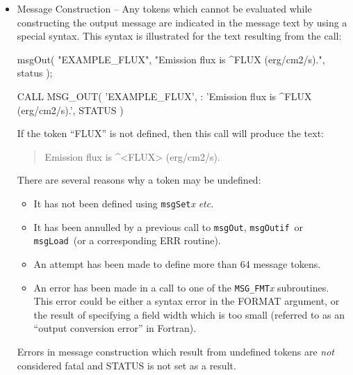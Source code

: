 \documentclass[twoside,11pt]{starlink}
\providecommand{\func}[1]{\texttt{#1}}
\providecommand{\msgload}{\func{msgLoad}}
\providecommand{\msgout}{\func{msgOut}}
\providecommand{\msgoutif}{\func{msgOutif}}
\begin{document}
\begin {itemize}
\item Message Construction -- Any tokens which cannot be evaluated while
constructing the output message are indicated in the message text by using a
special syntax.
This syntax is illustrated for the text resulting from the call:

\begin {small}
\begin{terminalv}
      msgOut( "EXAMPLE_FLUX",  "Emission flux is ^FLUX (erg/cm2/s).",
              status );

      CALL MSG_OUT( 'EXAMPLE_FLUX',
     :             'Emission flux is ^FLUX (erg/cm2/s).', STATUS )
\end{terminalv}
\end {small}

If the token ``FLUX'' is not defined, then this call will produce the text:

\begin {quote}
\begin {small}
\begin{terminalv}
Emission flux is ^<FLUX> (erg/cm2/s).
\end{terminalv}
\end {small}
\end {quote}

There are several reasons why a token may be undefined:

\begin {itemize}
\item It has not been defined using \func{msgSet}\textit{x} \textit{etc}.

\item It has been annulled by a previous call to \msgout, \msgoutif\ or
\msgload\ (or a corresponding ERR routine).

\item An attempt has been made to define more than 64 message tokens.

\item An error has been made in a call to one of the \func{MSG\_FMT}\textit{x}
subroutines.
This error could be either a syntax error in the FORMAT argument, or the
result of specifying a field width which is too small (referred to
as an ``output conversion error'' in Fortran).
\end {itemize}

Errors in message construction which result from undefined tokens are \emph{not}
considered fatal and STATUS is not set as a result.


\end{itemize}
\end{document}
